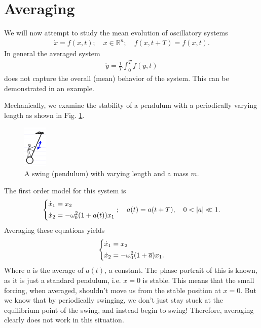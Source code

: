 \section{Averaging}
We will now attempt to study the mean evolution of oscillatory systems
\begin{align}
	\dot{x} = f(x,t);\quad x \in \mathbb{R}^{n};\quad f(x,t+T) = f(x,t).
\end{align}
In general the averaged system
\begin{align}
	\dot{y} = \frac{1}{T} \int_{0}^{T} f(y,t)	
\end{align}
does not capture the overall (mean) behavior of the system. This can be demonstrated in an example.
\begin{ex}
	Mechanically, we examine the stability of a pendulum with a periodically varying length as shown in Fig. \ref{fig:swing_drawing}.
	\begin{figure}[h!]
		\centering
		\includegraphics[width=0.1\textwidth]{figures/ch5/2swing_drawing.png}
		\caption{A swing (pendulum) with varying length and a mass $m$.}
		\label{fig:swing_drawing}
	\end{figure}
	The first order model for this system is
	\begin{align}
		\begin{dcases}
			\dot{x}_1 = x_2\\
			\dot{x}_2 = -\omega_0^2 (1+a(t))x_1
		\end{dcases}
		;\quad a(t) = a(t+T),\quad 0<|a|\ll 1.	
	\end{align}
Averaging these equations yields
\begin{align}
	\begin{dcases}
		\dot{x}_1 = x_2 \\
		\dot{x}_2 = -\omega_0^2(1+ \overline{a})x_1.
	\end{dcases}
\end{align}
Where $\overline{a}$ is the average of $a(t)$, a constant. The phase portrait of this is known, as it is just a standard pendulum, i.e. $x=0$ is stable. This means that the small forcing, when averaged, shouldn't move us from the stable position at $x=0$. But we know that by periodically swinging, we don't just stay stuck at the equilibrium point of the swing, and instead begin to swing! Therefore, averaging clearly does not work in this situation.
\end{ex}


